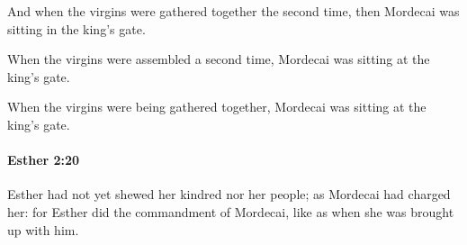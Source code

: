 			\begin{versebox}
					\item[BHS] 
					\item[LXX] 
					\item[ASV] And when the virgins were gathered together the second time, then Mordecai was sitting in the king's gate.
					\item[NIV] When the virgins were assembled a second time, Mordecai was sitting at the king’s gate.
					\item[NRSV] When the virgins were being gathered together, Mordecai was sitting at the king’s gate.
			\end{versebox}

		\paragraph{Esther 2:20} %
			\label{ESTHER-2-20}

			Esther had not yet shewed her kindred nor her people; as Mordecai had charged her: for Esther did the commandment of Mordecai, like as when she was brought up with him.

